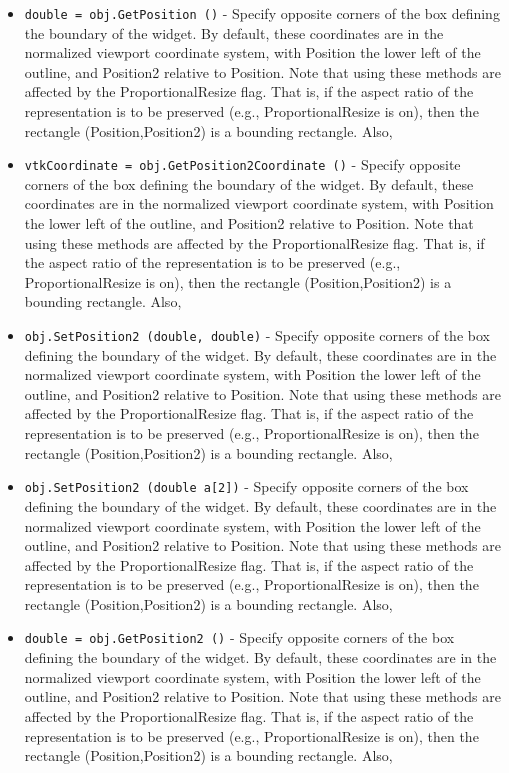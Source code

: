 \begin{itemize}
\item  \verb|double = obj.GetPosition ()| -  Specify opposite corners of the box defining the boundary of the
 widget. By default, these coordinates are in the normalized viewport
 coordinate system, with Position the lower left of the outline, and
 Position2 relative to Position. Note that using these methods are
 affected by the ProportionalResize flag. That is, if the aspect ratio of
 the representation is to be preserved (e.g., ProportionalResize is on),
 then the rectangle (Position,Position2) is a bounding rectangle. Also,

\item  \verb|vtkCoordinate = obj.GetPosition2Coordinate ()| -  Specify opposite corners of the box defining the boundary of the
 widget. By default, these coordinates are in the normalized viewport
 coordinate system, with Position the lower left of the outline, and
 Position2 relative to Position. Note that using these methods are
 affected by the ProportionalResize flag. That is, if the aspect ratio of
 the representation is to be preserved (e.g., ProportionalResize is on),
 then the rectangle (Position,Position2) is a bounding rectangle. Also,

\item  \verb|obj.SetPosition2 (double, double)| -  Specify opposite corners of the box defining the boundary of the
 widget. By default, these coordinates are in the normalized viewport
 coordinate system, with Position the lower left of the outline, and
 Position2 relative to Position. Note that using these methods are
 affected by the ProportionalResize flag. That is, if the aspect ratio of
 the representation is to be preserved (e.g., ProportionalResize is on),
 then the rectangle (Position,Position2) is a bounding rectangle. Also,

\item  \verb|obj.SetPosition2 (double a[2])| -  Specify opposite corners of the box defining the boundary of the
 widget. By default, these coordinates are in the normalized viewport
 coordinate system, with Position the lower left of the outline, and
 Position2 relative to Position. Note that using these methods are
 affected by the ProportionalResize flag. That is, if the aspect ratio of
 the representation is to be preserved (e.g., ProportionalResize is on),
 then the rectangle (Position,Position2) is a bounding rectangle. Also,

\item  \verb|double = obj.GetPosition2 ()| -  Specify opposite corners of the box defining the boundary of the
 widget. By default, these coordinates are in the normalized viewport
 coordinate system, with Position the lower left of the outline, and
 Position2 relative to Position. Note that using these methods are
 affected by the ProportionalResize flag. That is, if the aspect ratio of
 the representation is to be preserved (e.g., ProportionalResize is on),
 then the rectangle (Position,Position2) is a bounding rectangle. Also,


\end{itemize}
